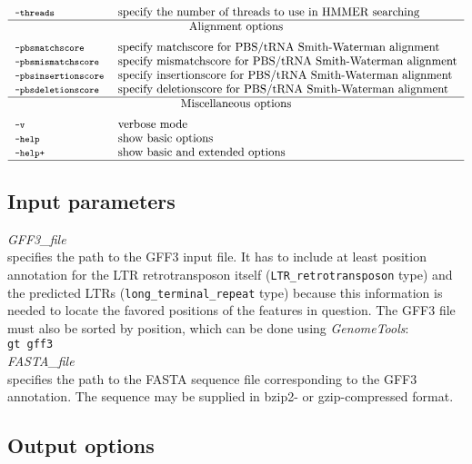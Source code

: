\documentclass[12pt,titlepage]{article}
\newcommand{\GenomeTools}{\textit{GenomeTools}\xspace}
\begin{document}
\begin{table}[htbp]
\begin{footnotesize}
\[\begin{tabular}{ll}
\Showoption{threads}& specify the number of threads to use in HMMER searching
\\
\Showoptiongroup{Alignment options}
\Showoption{pbsmatchscore}& specify matchscore for PBS/tRNA Smith-Waterman alignment
\\
\Showoption{pbsmismatchscore}& specify mismatchscore for PBS/tRNA Smith-Waterman alignment
\\
\Showoption{pbsinsertionscore}& specify insertionscore for PBS/tRNA Smith-Waterman alignment
\\
\Showoption{pbsdeletionscore}& specify deletionscore for PBS/tRNA Smith-Waterman alignment
\\
\Showoptiongroup{Miscellaneous options}
\Showoption{v}& verbose mode
\\
\Showoption{help}& show basic options
\\
\Showoption{help+}& show basic and extended options
\\
\hline
\end{tabular}
\]
\end{footnotesize}
\label{overviewOpt}
\end{table}

\subsection{Input parameters}

\emph{GFF3\_file}\\ specifies the path to the GFF3 input file. It has to include at least position annotation for the LTR retrotransposon itself (\texttt{LTR\_retrotransposon} type) and the predicted LTRs (\texttt{long\_terminal\_repeat} type) because this information is needed to locate the favored positions of the features in question. The GFF3 file must also be sorted by position, which can be done using \GenomeTools :\\
\texttt{gt gff3}   \texttt{} \\

\emph{FASTA\_file}\\ specifies the path to the FASTA sequence file corresponding to the GFF3 annotation. The sequence may be supplied in bzip2- or gzip-compressed format.

\subsection{Output options}
\end{document}
